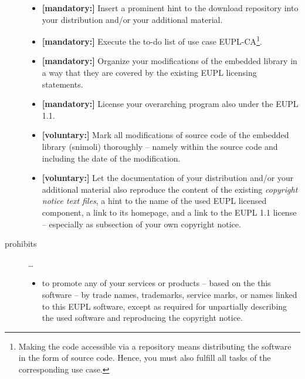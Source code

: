 \begin{description}
\begin{itemize}
  \item \textbf{[mandatory:]} Insert a prominent hint to the download repository
  into your distribution and/or your additional material.
  
  \item \textbf{[mandatory:]} Execute the to-do list of use case EUPL-CA\footnote{
  Making the code accessible via a repository means distributing the software in
  the form of source code. Hence, you must also fulfill all tasks of the
  corresponding use case.}.
  
  \item \textbf{[mandatory:]} Organize your modifications of the embedded
  library in a way that they are covered by the existing EUPL licensing
  statements. 
  
  \item \textbf{[mandatory:]} License your overarching program also under the
  EUPL 1.1.
  
  \item \textbf{[voluntary:]} Mark all modifications of source code of the
  embedded library (snimoli) thoroughly -- namely within the source code and
  including the date of the modification.

  \item \textbf{[voluntary:]} Let the documentation of your distribution and/or
  your additional material  also reproduce the content of the existing
  \emph{copyright notice text files}, a hint to the name of the used EUPL
  licensed component, a link to its homepage, and a link to the EUPL 1.1 license
  -- especially as subsection of your own copyright notice.
  
\end{itemize}

\item[prohibits] \ldots
\begin{itemize}
  \item to promote any of your services or products -- based on the this software
  -- by trade names, trademarks, service marks, or names linked to this EUPL
  software, except as required for unpartially describing the used software and
  reproducing the copyright notice.
\end{itemize}

\end{description}

